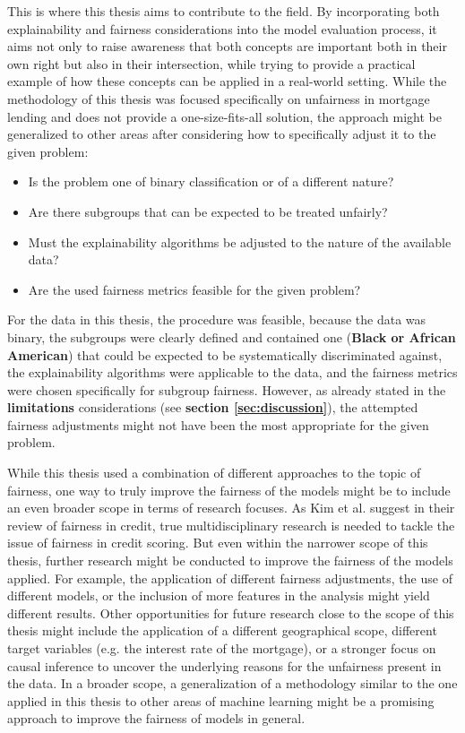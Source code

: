 This is where this thesis aims to contribute to the field. By incorporating both explainability and fairness considerations into the model evaluation process, it aims not only to raise awareness that both concepts are important both in their own right but also in their intersection, while trying to provide a practical example of how these concepts can be applied in a real-world setting.
While the methodology of this thesis was focused specifically on unfairness in mortgage lending and does not provide a one-size-fits-all solution, the approach might be generalized to other areas after considering how to specifically adjust it to the given problem:
\begin{itemize}
    \item Is the problem one of binary classification or of a different nature?
    \item Are there subgroups that can be expected to be treated unfairly?
    \item Must the explainability algorithms be adjusted to the nature of the available data?
    \item Are the used fairness metrics feasible for the given problem?
\end{itemize}
For the data in this thesis, the procedure was feasible, because the data was binary, the subgroups were clearly defined and contained one (\textbf{Black or African American}) that could be expected to be systematically discriminated against, the explainability algorithms were applicable to the data, and the fairness metrics were chosen specifically for subgroup fairness. 
However, as already stated in the \textbf{limitations} considerations (see \textbf{section \ref{sec:discussion}}), the attempted fairness adjustments might not have been the most appropriate for the given problem.

While this thesis used a combination of different approaches to the topic of fairness, one way to truly improve the fairness of the models might be to include an even broader scope in terms of research focuses.
As Kim et al. \parencite{Kim2023} suggest in their review of fairness in credit, true multidisciplinary research is needed to tackle the issue of fairness in credit scoring.
But even within the narrower scope of this thesis, further research might be conducted to improve the fairness of the models applied. For example, the application of different fairness adjustments, the use of different models, or the inclusion of more features in the analysis might yield different results.
Other opportunities for future research close to the scope of this thesis might include the application of a different geographical scope, different target variables (e.g. the interest rate of the mortgage), or a stronger focus on causal inference to uncover the underlying reasons for the unfairness present in the data.
In a broader scope, a generalization of a methodology similar to the one applied in this thesis to other areas of machine learning might be a promising approach to improve the fairness of models in general.

